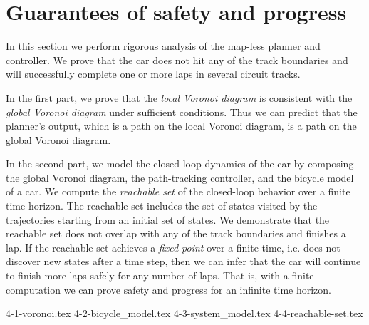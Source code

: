 \section{Guarantees of safety and progress}
\label{sec:guarantees}

In this section we perform rigorous analysis of the map-less planner and controller.
%
We prove that the car does not hit any of the track boundaries and will successfully complete one or more laps in several circuit tracks.


In the first part, we prove that the \emph{local Voronoi diagram} is consistent with the \emph{global Voronoi diagram} under sufficient conditions.
%
Thus we can predict that the planner's output, which is a path on the local Voronoi diagram, is a path on the global Voronoi diagram.


In the second part, we model the closed-loop dynamics of the car by composing the global Voronoi diagram, the path-tracking controller, and the bicycle model of a car.
%
We compute the \emph{reachable set} of the closed-loop behavior over a finite time horizon.
%
The reachable set includes the set of states visited by the trajectories starting from an initial set of states.
%
We demonstrate that the reachable set does not overlap with any of the track boundaries and finishes a lap.
%
If the reachable set achieves a \emph{fixed point} over a finite time, i.e. does not discover new states after a time step, then we can infer that the car will continue to finish more laps safely for any number of laps.
%
That is, with a finite computation we can prove safety and progress for an infinite time horizon.

{4-1-voronoi.tex}
{4-2-bicycle_model.tex}
{4-3-system_model.tex}
{4-4-reachable-set.tex}


